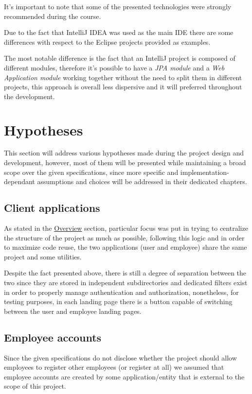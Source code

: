 It's important to note that some of the presented technologies were strongly recommended during the course. 

Due to the fact that IntelliJ IDEA was used as the main IDE there are some differences with respect to the Eclipse projects provided as examples. 

The most notable difference is the fact that an IntelliJ project is composed of different modules, therefore it's possible to have a \textit{JPA module} and a \textit{Web Application module} working together without the need to split them in different projects, this approach is overall less dispersive and it will preferred throughout the development.


\section{Hypotheses}

This section will address various hypotheses made during the project design and development, however, most of them will be presented while maintaining a broad scope over the given specifications, since more specific and implementation-dependant assumptions and choices will be addressed in their dedicated chapters. 

\subsection*{Client applications}

As stated in the \hyperref[sec:overview]{Overview} section, particular focus was put in trying to centralize the structure of the project as much as possible, following this logic and in order to maximize code reuse, the two applications (user and employee) share the same project and some utilities.

Despite the fact presented above, there is still a degree of separation between the two since they are stored in independent subdirectories and dedicated filters exist in order to properly manage authentication and authorization, nonetheless, for testing purposes, in each landing page there is a button capable of switching between the user and employee landing pages.

\subsection*{Employee accounts}

Since the given specifications do not disclose whether the project should allow employees to register other employees (or register at all) we assumed that employee accounts are created by some application/entity that is external to the scope of this project.

